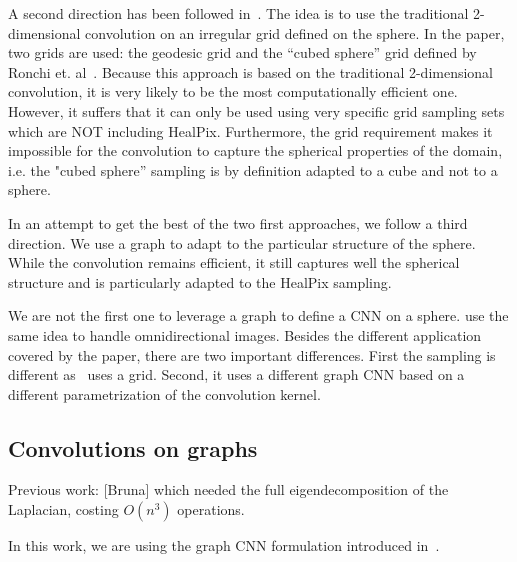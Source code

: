 \documentclass[final,twocolumn,3p,times,authoryear]{elsarticle}
\newcommand{\nati}[1]{{\color[rgb]{.1,.6,.1}{#1}}}
\newcommand{\todo}[1]{{\color[rgb]{.6,.1,.6}{#1}}}
\newcommand{\assign}[1]{{\color[rgb]{.8,.5,.8}{Assigned: #1 }}}
\newcommand{\1}{\b{1}}              %
\newcommand{\0}{\b{0}}              %
\begin{document}
A second direction has been followed in~\cite{boomsma2017spherical}. The idea is
to use the traditional 2-dimensional convolution on an irregular grid defined on the
sphere. In the paper, two grids are used: the geodesic grid and the “cubed
sphere” grid defined by Ronchi et. al~\cite{ronchi1996cubed}. Because this
approach is based on the traditional 2-dimensional convolution, it is very likely to be the
most computationally efficient one. However, it suffers that it can only be used using very
specific grid sampling sets which are NOT including HealPix. Furthermore, the
grid requirement makes it impossible for the convolution to capture the
spherical properties of the domain, i.e. the "cubed sphere” sampling is by
definition adapted to a cube and not to a sphere.

In an attempt to get the best of the two first approaches, we follow a third
direction. We use a graph to adapt to the particular structure of the sphere.
While the convolution remains efficient, it still captures well the spherical
structure and is particularly adapted to the HealPix sampling.

We are not the first one to leverage a graph to define a CNN on a sphere.
\cite{khasanova2017graph} use the same idea to handle omnidirectional images.
Besides the different application covered by the paper, there are two important
differences. First the sampling is different as~\cite{khasanova2017graph} uses a
grid. Second, it uses a different graph CNN based on a different parametrization
of the convolution kernel.

\todo{Cool to have a global illustration of the network (CNN like)}


\subsection{Convolutions on graphs}
\assign{Michaël}

\todo{other approaches? GNNs, Kipf first order approx, message passing}

Previous work: [Bruna] which needed the full eigendecomposition of the Laplacian, costing $O(n^3)$ operations.

In this work, we are using the graph CNN formulation introduced in~\cite{defferrard2016convolutional}.
\end{document}
